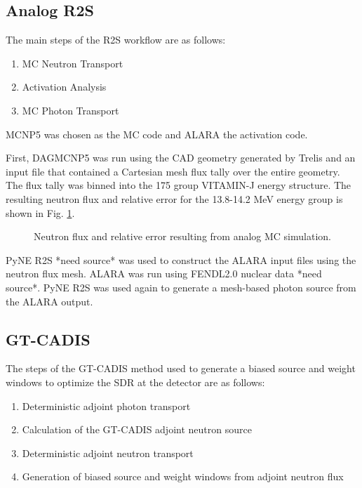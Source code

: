 \subsection{Analog R2S}\label{sec:analog}
The main steps of the R2S workflow are as follows:
\begin{enumerate}
	\item MC Neutron Transport
	\item Activation Analysis
	\item MC Photon Transport
\end{enumerate}
MCNP5 was chosen as the MC code and ALARA the activation code.  

First, DAGMCNP5 was run using the CAD geometry generated by Trelis and an input
file that contained a Cartesian mesh flux tally over the entire geometry.  The
flux tally was binned into the 175 group VITAMIN-J energy structure.  The resulting
neutron flux and relative error for the 13.8-14.2 MeV energy group is shown in
Fig. \ref{fig:nflux}.
\begin{figure} \label{fig:nflux}
	\caption [Analog neutron flux and error] 
	{Neutron flux and relative error resulting from analog MC simulation.}
\end{figure}

PyNE R2S *need source* was used
to construct the ALARA input files using the neutron flux mesh.
ALARA was run using FENDL2.0 nuclear data *need source*. PyNE R2S
was used again to generate a mesh-based photon source from the ALARA output.  



\subsection{GT-CADIS}\label{sec:gtcadis}
The steps of the GT-CADIS method used to generate a biased source and weight windows to optimize
the SDR at the detector are as follows:
\begin{enumerate}
	\item Deterministic adjoint photon transport
	\item Calculation of the GT-CADIS adjoint neutron source
	\item Deterministic adjoint neutron transport
	\item Generation of biased source and weight windows from adjoint neutron flux
\end{enumerate}

